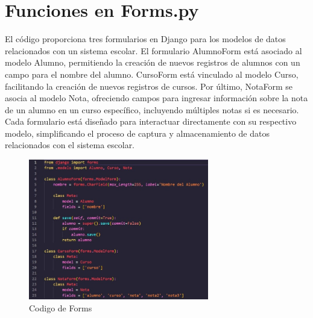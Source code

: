 \documentclass[10pt, a4paper]{article}
\begin{document}
\section{Funciones en Forms.py}
El código proporciona tres formularios en Django para los modelos de datos relacionados con un sistema escolar. El formulario AlumnoForm está asociado al modelo Alumno, permitiendo la creación de nuevos registros de alumnos con un campo para el nombre del alumno. CursoForm está vinculado al modelo Curso, facilitando la creación de nuevos registros de cursos. Por último, NotaForm se asocia al modelo Nota, ofreciendo campos para ingresar información sobre la nota de un alumno en un curso específico, incluyendo múltiples notas si es necesario. Cada formulario está diseñado para interactuar directamente con su respectivo modelo, simplificando el proceso de captura y almacenamiento de datos relacionados con el sistema escolar.
\begin{figure}[H]
  \centering
  \includegraphics[width=0.7\textwidth]{img/imagen4.jpeg}
  \caption{Codigo de Forms}
\end{figure}  
\end{document}

